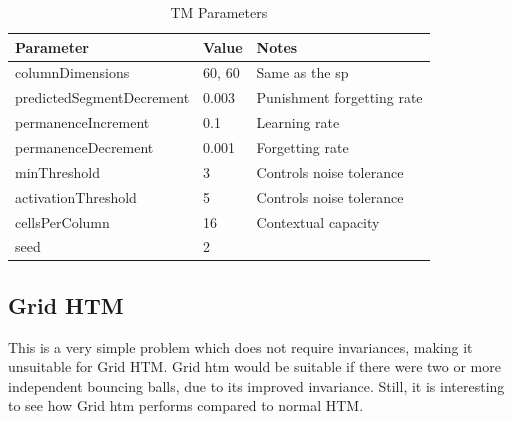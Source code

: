 \begin{table}[H]
    \centering
    \begin{tabularx}{\linewidth}{@{}llX@{}}
        \toprule
        \textbf{Parameter}        & \textbf{Value} & \textbf{Notes}             \\
        \midrule
        columnDimensions          & 60, 60         & Same as the \gls*{sp}      \\
        predictedSegmentDecrement & 0.003          & Punishment forgetting rate \\
        permanenceIncrement       & 0.1            & Learning rate              \\
        permanenceDecrement       & 0.001          & Forgetting rate            \\
        minThreshold              & 3              & Controls noise tolerance   \\
        activationThreshold       & 5              & Controls noise tolerance   \\
        cellsPerColumn            & 16             & Contextual capacity        \\
        seed                      & 2              &                            \\
        \bottomrule
    \end{tabularx}

    \caption{TM Parameters}
    \label{tab:bb_TM_params}
\end{table}
\subsection{Grid HTM}
This is a very simple problem which does not require invariances, making it unsuitable for Grid HTM. Grid \gls*{htm} would be suitable if there were two or more independent bouncing balls, due to its improved invariance. Still, it is interesting to see how Grid \gls*{htm} performs compared to normal HTM.
